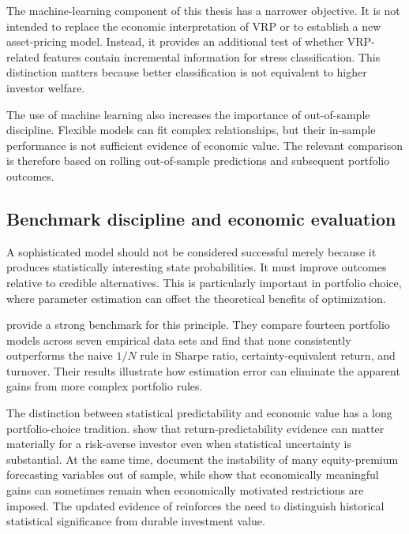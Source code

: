 The machine-learning component of this thesis has a narrower objective. It is not intended to replace the economic interpretation of VRP or to establish a new asset-pricing model. Instead, it provides an additional test of whether VRP-related features contain incremental information for stress classification. This distinction matters because better classification is not equivalent to higher investor welfare.

The use of machine learning also increases the importance of out-of-sample discipline. Flexible models can fit complex relationships, but their in-sample performance is not sufficient evidence of economic value. The relevant comparison is therefore based on rolling out-of-sample predictions and subsequent portfolio outcomes.

\subsection{Benchmark discipline and economic evaluation}

A sophisticated model should not be considered successful merely because it produces statistically interesting state probabilities. It must improve outcomes relative to credible alternatives. This is particularly important in portfolio choice, where parameter estimation can offset the theoretical benefits of optimization.

\textcite{DeMiguelGarlappiUppal2009} provide a strong benchmark for this principle. They compare fourteen portfolio models across seven empirical data sets and find that none consistently outperforms the naive \(1/N\) rule in Sharpe ratio, certainty-equivalent return, and turnover. Their results illustrate how estimation error can eliminate the apparent gains from more complex portfolio rules.

The distinction between statistical predictability and economic value has a long portfolio-choice tradition. \textcite{KandelStambaugh1996} show that return-predictability evidence can matter materially for a risk-averse investor even when statistical uncertainty is substantial. At the same time, \textcite{WelchGoyal2008} document the instability of many equity-premium forecasting variables out of sample, while \textcite{CampbellThompson2008} show that economically meaningful gains can sometimes remain when economically motivated restrictions are imposed. The updated evidence of \textcite{GoyalWelchZafirov2024} reinforces the need to distinguish historical statistical significance from durable investment value.


